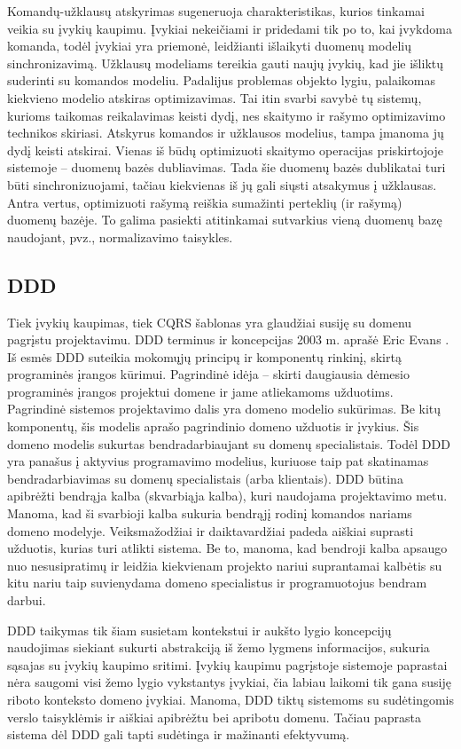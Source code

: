 Komandų-užklausų atskyrimas sugeneruoja charakteristikas, kurios tinkamai veikia su įvykių kaupimu. Įvykiai nekeičiami ir pridedami tik po to, kai įvykdoma komanda, todėl įvykiai yra priemonė, leidžianti išlaikyti duomenų modelių sinchronizavimą. Užklausų modeliams tereikia gauti naujų įvykių, kad jie išliktų suderinti su komandos modeliu. Padalijus problemas objekto lygiu, palaikomas kiekvieno modelio atskiras optimizavimas. Tai itin svarbi savybė tų sistemų, kurioms taikomas reikalavimas keisti dydį, nes skaitymo ir rašymo optimizavimo technikos skiriasi. Atskyrus komandos ir užklausos modelius, tampa įmanoma jų dydį keisti atskirai. Vienas iš būdų optimizuoti skaitymo operacijas priskirtojoje sistemoje – duomenų bazės dubliavimas. Tada šie duomenų bazės dublikatai turi būti sinchronizuojami, tačiau kiekvienas iš jų gali siųsti atsakymus į užklausas. Antra vertus, optimizuoti rašymą reiškia sumažinti perteklių (ir rašymą) duomenų bazėje. To galima pasiekti atitinkamai sutvarkius vieną duomenų bazę naudojant, pvz., normalizavimo taisykles.

\subsection{DDD}

Tiek įvykių kaupimas, tiek CQRS šablonas yra glaudžiai susiję su domenu pagrįstu projektavimu. DDD terminus ir koncepcijas 2003 m. aprašė Eric Evans \cite{evans2004domaindriven}. Iš esmės DDD suteikia mokomųjų principų ir komponentų rinkinį, skirtą programinės įrangos kūrimui. Pagrindinė idėja – skirti daugiausia dėmesio programinės įrangos projektui domene ir jame atliekamoms užduotims. Pagrindinė sistemos projektavimo dalis yra domeno modelio sukūrimas. Be kitų komponentų, šis modelis aprašo pagrindinio domeno užduotis ir įvykius. Šis domeno modelis sukurtas bendradarbiaujant su domenų specialistais. Todėl DDD yra panašus į aktyvius programavimo modelius, kuriuose taip pat skatinamas bendradarbiavimas su domenų specialistais (arba klientais). DDD būtina apibrėžti bendrąja kalba (skvarbiąja kalba), kuri naudojama projektavimo metu. Manoma, kad ši svarbioji kalba sukuria bendrąjį rodinį komandos nariams domeno modelyje. Veiksmažodžiai ir daiktavardžiai padeda aiškiai suprasti užduotis, kurias turi atlikti sistema. Be to, manoma, kad bendroji kalba apsaugo nuo nesusipratimų ir leidžia kiekvienam projekto nariui suprantamai kalbėtis su kitu nariu taip suvienydama domeno specialistus ir programuotojus bendram darbui.

DDD taikymas tik šiam susietam kontekstui ir aukšto lygio koncepcijų naudojimas siekiant sukurti abstrakciją iš žemo lygmens informacijos, sukuria sąsajas su įvykių kaupimo sritimi. Įvykių kaupimu pagrįstoje sistemoje paprastai nėra saugomi visi žemo lygio vykstantys įvykiai, čia labiau laikomi tik gana susiję riboto konteksto domeno įvykiai. Manoma, DDD tiktų sistemoms su sudėtingomis verslo taisyklėmis ir aiškiai apibrėžtu bei apribotu domenu. Tačiau paprasta sistema dėl DDD gali tapti sudėtinga ir mažinanti efektyvumą.

